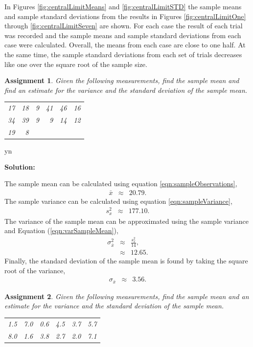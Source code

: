 \documentclass[12pt]{article}
\def\solutions{y}
\def\solutions{n}
\newtheorem{assignment}{Assignment}[section]
\begin{document}
In Figures \ref{fig:centralLimitMeans} and \ref{fig:centralLimitSTD}
the sample means and sample standard deviations from the results in
Figures \ref{fig:centralLimitOne} through \ref{fig:centralLimitSeven}
are shown. For each case the result of each trial was recorded and the
sample means and sample standard deviations from each case were
calculated. Overall, the means from each case are close to one
half. At the same time, the sample standard deviations from each set
of trials decreases like one over the square root of the sample size.


\begin{assignment}
  Given the following measurements, find the sample mean and find an
  estimate for the variance and the standard deviation of the sample
  mean.
  \begin{center}
    \begin{tabular}{rrrrrr}
      17 & 18 & 9 & 41 & 46 & 16 \\
      34 & 39 & 9 & 9  & 14 & 12 \\
      19 & 8      
    \end{tabular}
  \end{center}

\end{assignment}

\if y\solutions

\textbf{Solution:}

The sample mean can be calculated using equation
\ref{eqn:sampleObservations},
\begin{eqnarray*}
  \bar{x} & \approx & 20.79.
\end{eqnarray*}
The sample variance can be calculated using equation
\ref{eqn:sampleVariance}, 
\begin{eqnarray*}
  s^2_x & \approx & 177.10.
\end{eqnarray*}
The variance of the sample mean can be approximated using the sample
variance and Equation (\ref{eqn:varSampleMean}),
\begin{eqnarray*}
  \sigma^2_{\bar{x}} & \approx & \frac{s^2_x}{14},\\
    & \approx & 12.65.
\end{eqnarray*}
Finally, the standard deviation of the sample mean is found by taking
the square root of the variance,
\begin{eqnarray*}
  \sigma_{\bar{x}} & \approx & 3.56.
\end{eqnarray*}

\fi


\begin{assignment}
  Given the following measurements, find the sample mean and an
  estimate for the variance and the standard deviation of the sample
  mean.
  \begin{center}
    \begin{tabular}{rrrrrr}
       1.5 & 7.0 & 0.6 & 4.5 & 3.7 & 5.7 \\
       8.0 & 1.6 & 3.8 & 2.7 & 2.0 & 7.1
    \end{tabular}
  \end{center}
\end{assignment}
\end{document}
